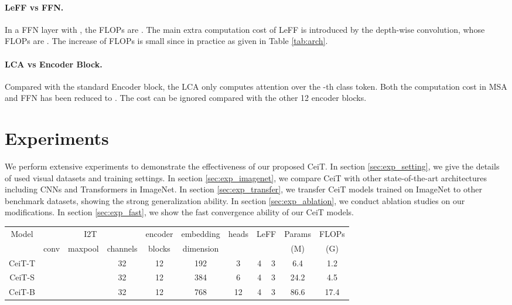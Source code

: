 \documentclass[10pt,twocolumn,letterpaper]{article}
\begin{document}
\paragraph{LeFF vs FFN.} In a FFN layer with , the FLOPs are . The main extra computation cost of LeFF is introduced by the depth-wise convolution, whose FLOPs are . The increase of FLOPs is small since  in practice as given in Table \ref{tab:arch}.

\paragraph{LCA vs Encoder Block.} Compared with the standard Encoder block, the LCA only computes attention over the -th class token. Both the computation cost in MSA and FFN has been reduced to . The cost can be ignored compared with the other 12 encoder blocks.










\section{Experiments}

We perform extensive experiments to demonstrate the effectiveness of our proposed CeiT. In section \ref{sec:exp_setting}, we give the details of used visual datasets and training settings. In section \ref{sec:exp_imagenet}, we compare CeiT with other state-of-the-art architectures including CNNs and Transformers in ImageNet.  In section \ref{sec:exp_transfer}, we transfer CeiT models trained on ImageNet to other benchmark datasets, showing the strong generalization ability. In section \ref{sec:exp_ablation}, we conduct ablation studies on our modifications. In section \ref{sec:exp_fast}, we show the fast convergence ability of our CeiT models.


\begin{table*}[t]
    \centering
    \small
    \caption{Variants of our CeiT architecture. The FLOPs are calculated for images at resolution . And  means a convolution/pooling with kernel size of 7 and stride of 2.}
    \begin{tabular}{c|c|c|c|c|c|c|c|c|c|c}
    \toprule
    \multirow{2}{*}{Model} & \multicolumn{3}{c}{I2T} & encoder & embedding & \multirow{2}{*}{heads} & \multicolumn{2}{c}{LeFF} & Params & FLOPs \\
                           & conv & maxpool & channels & blocks & dimension & &  &  & (M) & (G) \\
    \midrule
    CeiT-T &  &  & 32 & 12 & 192 & 3 & 4 & 3 & 6.4 & 1.2 \\
    CeiT-S &  &  & 32 & 12 & 384 & 6 & 4 & 3 & 24.2 & 4.5 \\
    CeiT-B &  &  & 32 & 12 & 768 & 12 & 4 & 3 & 86.6 & 17.4 \\
    \bottomrule
    \end{tabular}
    \label{tab:arch}
\end{table*}
\end{document}
